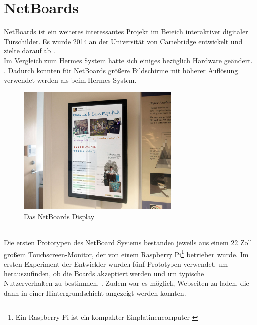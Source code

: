 \section{NetBoards}
NetBoards\cite{wood:2014,netboards:website} ist ein weiteres interessantes Projekt im Bereich interaktiver digitaler Türschilder. Es wurde 2014 an der Universität von Camebridge entwickelt und zielte darauf ab .
\\
Im Vergleich zum Hermes System hatte sich einiges bezüglich Hardware geändert. .
Dadurch konnten für NetBoards größere Bildschirme mit höherer Auflösung  verwendet werden als beim Hermes System.
\begin{figure}[h!]
  \centering
    \includegraphics[width=0.7\textwidth]{./img/netBoards_display.png}
  \caption{Das NetBoards Display\cite{wood:2014}}
  \label{img:netBoardsDisplay}
\end{figure}
\\
Die ersten Prototypen des NetBoard Systems bestanden jeweils aus einem 22 Zoll großem Touchscreen-Monitor, der von einem Raspberry Pi\footnote{Ein Raspberry Pi ist ein kompakter Einplatinencomputer \cite{raspberrypi:website}} betrieben wurde.
Im ersten Experiment der Entwickler wurden fünf Prototypen verwendet, um herauszufinden, ob die Boards akzeptiert werden und um typische Nutzerverhalten zu bestimmen.
. Zudem war es möglich, Webseiten zu laden, die dann in einer Hintergrundschicht angezeigt werden konnten.
